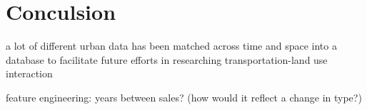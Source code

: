 \chapter{Conculsion} \label{ch:conclusion}

a lot of different urban data has been matched across time and space into a database to facilitate future efforts in researching transportation-land use interaction

feature engineering: years between sales? (how would it reflect a change in type?)